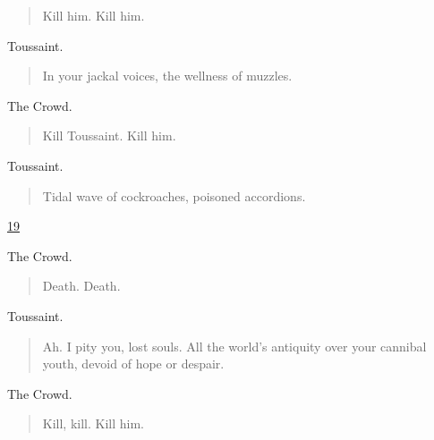 \documentclass[letterpaper,article,12pt,oneside,notitlepage]{memoir}
\begin{document}
\begin{verse}
Kill him. Kill him. \\
\end{verse}

\begin{center}Toussaint.\end{center}

\begin{verse}
In your jackal voices, the wellness of muzzles. \\
\end{verse}

\begin{center}The Crowd.\end{center}

\begin{verse}
Kill Toussaint. Kill him. \\
\end{verse}

\begin{center}Toussaint.\end{center}

\begin{verse}
Tidal wave of cockroaches, poisoned accordions. \\
\end{verse}

\clearpage

\href{http://cesaire.elotroalex.com/chiens/chiens/p019.html}{19}

\begin{center}The Crowd.\end{center}

\begin{verse}
Death. Death. \\
\end{verse}

\begin{center}Toussaint.\end{center}

\begin{verse}
\indent Ah. I pity you, lost souls. All the world's antiquity over your cannibal youth, devoid of hope or despair. \\
\end{verse}

\begin{center}The Crowd.\end{center}

\begin{verse}
\hspace{1cm} Kill, kill. Kill him. \\
\end{verse}
\end{document}
